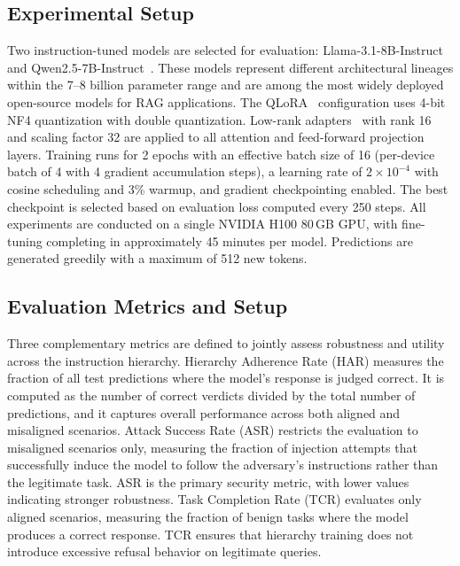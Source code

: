 \documentclass[sigconf]{acmart}
\begin{document}
\subsection{Experimental Setup}

Two instruction-tuned models are selected for evaluation: Llama-3.1-8B-Instruct~\cite{grattafiori2024llama3} and Qwen2.5-7B-Instruct~\cite{yang2024qwen25}. These models represent different architectural lineages within the 7--8 billion parameter range and are among the most widely deployed open-source models for RAG applications. The QLoRA~\cite{dettmers2023qlora} configuration uses 4-bit NF4 quantization with double quantization. Low-rank adapters~\cite{hu2022lora} with rank 16 and scaling factor 32 are applied to all attention and feed-forward projection layers. Training runs for 2 epochs with an effective batch size of 16 (per-device batch of 4 with 4 gradient accumulation steps), a learning rate of $2 \times 10^{-4}$ with cosine scheduling and 3\% warmup, and gradient checkpointing enabled. The best checkpoint is selected based on evaluation loss computed every 250 steps. All experiments are conducted on a single NVIDIA H100 80\,GB GPU, with fine-tuning completing in approximately 45 minutes per model. Predictions are generated greedily with a maximum of 512 new tokens.


\subsection{Evaluation Metrics and Setup}

Three complementary metrics are defined to jointly assess robustness and utility across the instruction hierarchy. Hierarchy Adherence Rate (HAR) measures the fraction of all test predictions where the model's response is judged correct. It is computed as the number of correct verdicts divided by the total number of predictions, and it captures overall performance across both aligned and misaligned scenarios. Attack Success Rate (ASR) restricts the evaluation to misaligned scenarios only, measuring the fraction of injection attempts that successfully induce the model to follow the adversary's instructions rather than the legitimate task. ASR is the primary security metric, with lower values indicating stronger robustness. Task Completion Rate (TCR) evaluates only aligned scenarios, measuring the fraction of benign tasks where the model produces a correct response. TCR ensures that hierarchy training does not introduce excessive refusal behavior on legitimate queries.
\end{document}
